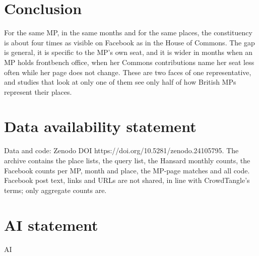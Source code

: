 \documentclass[11pt,a4paper]{article}
\begin{document}
\section{Conclusion}\label{sec:conc}
For the same MP, in the same months and for the same places, the constituency is about four times as visible on Facebook as in the House of Commons. The gap is general, it is specific to the MP's own seat, and it is wider in months when an MP holds frontbench office, when her Commons contributions name her seat less often while her page does not change. These are two faces of one representative, and studies that look at only one of them see only half of how British MPs represent their places.

\section*{Data availability statement}
Data and code: Zenodo DOI https://doi.org/10.5281/zenodo.24105795. The archive contains the place lists, the query list, the Hansard monthly counts, the Facebook counts per MP, month and place, the MP-page matches and all code. Facebook post text, links and URLs are not shared, in line with CrowdTangle's terms; only aggregate counts are.

\section*{AI statement}
{{AI}}
\end{document}
